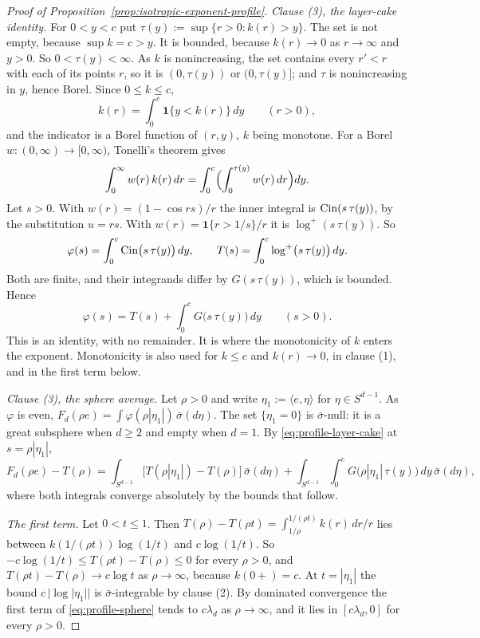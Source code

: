 \begin{proof}[Proof of Proposition~\ref{prop:isotropic-exponent-profile}]
\emph{Clause (3), the layer-cake identity.} For $0 < y < c$ put
$\tau(y) := \sup\{r > 0 : k(r) > y\}$. The set is not empty, because $\sup k = c > y$. It is
bounded, because $k(r) \to 0$ as $r \to \infty$ and $y > 0$. So $0 < \tau(y) < \infty$. As $k$ is
nonincreasing, the set contains every $r' < r$ with each of its points $r$, so it is
$(0,\tau(y))$ or $(0,\tau(y)]$; and $\tau$ is nonincreasing in $y$, hence Borel. Since
$0 \le k \le c$,
\[
  k(r) = \int_0^c \mathbf 1\{y < k(r)\}\,dy \qquad (r > 0),
\]
and the indicator is a Borel function of $(r,y)$, $k$ being monotone. For a Borel
$w : (0,\infty) \to [0,\infty)$, Tonelli's theorem gives
\[
  \int_0^\infty w(r)\,k(r)\,dr = \int_0^c\Bigl(\int_0^{\tau(y)}w(r)\,dr\Bigr)dy .
\]
Let $s > 0$. With $w(r) = (1 - \cos rs)/r$ the inner integral is $\operatorname{Cin}(s\,\tau(y))$, by the
substitution $u = rs$. With $w(r) = \mathbf 1\{r > 1/s\}/r$ it is $\log^+(s\,\tau(y))$. So
\[
  \varphi(s) = \int_0^c \operatorname{Cin}\bigl(s\,\tau(y)\bigr)\,dy, \qquad
  T(s) = \int_0^c \log^+\bigl(s\,\tau(y)\bigr)\,dy .
\]
Both are finite, and their integrands differ by $G(s\,\tau(y))$, which is bounded. Hence
\begin{equation}\label{eq:profile-layer-cake}
  \varphi(s) = T(s) + \int_0^c G\bigl(s\,\tau(y)\bigr)\,dy \qquad (s > 0) .
\end{equation}
This is an identity, with no remainder. It is where the monotonicity of $k$ enters the exponent.
Monotonicity is also used for $k \le c$ and $k(r) \to 0$, in clause (1), and in the first term
below.

\emph{Clause (3), the sphere average.} Let $\rho > 0$ and write
$\eta_1 := \langle e,\eta\rangle$ for $\eta \in S^{d-1}$. As $\varphi$ is even,
$F_d(\rho e) = \int\varphi(\rho|\eta_1|)\,\bar\sigma(d\eta)$. The set $\{\eta_1 = 0\}$ is
$\bar\sigma$-null: it is a great subsphere when $d \ge 2$ and empty when $d = 1$. By
\ref{eq:profile-layer-cake} at $s = \rho|\eta_1|$,
\begin{equation}\label{eq:profile-sphere}
  F_d(\rho e) - T(\rho) = \int_{S^{d-1}}\bigl[T(\rho|\eta_1|) - T(\rho)\bigr]\,\bar\sigma(d\eta)
   + \int_{S^{d-1}}\int_0^c G\bigl(\rho|\eta_1|\,\tau(y)\bigr)\,dy\,\bar\sigma(d\eta) ,
\end{equation}
where both integrals converge absolutely by the bounds that follow.

\emph{The first term.} Let $0 < t \le 1$. Then
$T(\rho) - T(\rho t) = \int_{1/\rho}^{1/(\rho t)}k(r)\,dr/r$ lies between
$k(1/(\rho t))\log(1/t)$ and $c\log(1/t)$. So $-c\log(1/t) \le T(\rho t) - T(\rho) \le 0$ for
every $\rho > 0$, and $T(\rho t) - T(\rho) \to c\log t$ as $\rho \to \infty$, because
$k(0{+}) = c$. At $t = |\eta_1|$ the bound $c\,|\log|\eta_1||$ is $\bar\sigma$-integrable by
clause (2). By dominated convergence the first term of \ref{eq:profile-sphere} tends to
$c\lambda_d$ as $\rho \to \infty$, and it lies in $[c\lambda_d, 0]$ for every $\rho > 0$.


\end{proof}
